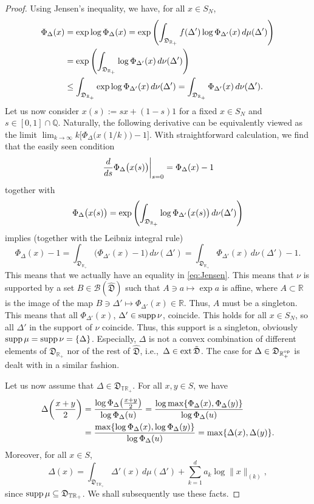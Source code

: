 \documentclass[12pt,a4paper,reqno]{amsart}
\theoremstyle{definition}
\newcommand{\mc}[1]{\mathcal{#1}}
\newcommand{\mf}[1]{\mathfrak{#1}}
\newcommand{\R}{\mathbb R}
\newcommand{\Q}{\mathbb Q}
\newcommand{\T}{\mathbb T}
\let\originalleft\left
\let\originalright\right
\renewcommand{\left}{\mathopen{}\mathclose\bgroup\originalleft}
\renewcommand{\right}{\aftergroup\egroup\originalright}
\begin{document}
\begin{proof}
Using Jensen's inequality, we have, for all $x\in S_N$,
\begin{align}
\Phi_\Delta(x)&=\exp{\log{\Phi_\Delta(x)}}=\exp{\left(\int_{\mf D_{\R_+}}f(\Delta')\log{\Phi_{\Delta'}(x)}\,d\mu(\Delta')\right)}\nonumber\\
&=\exp{\left(\int_{\mf D_{\R_+}}\log{\Phi_{\Delta'}(x)}\,d\nu(\Delta')\right)}\nonumber\\
&\leq\int_{\mf D_{\R_+}}\exp{\log{\Phi_{\Delta'}(x)}}\,d\nu(\Delta')=\int_{\mf D_{\R_+}}\Phi_{\Delta'}(x)\,d\nu(\Delta').\label{eq:Jensen}
\end{align}
Let us now consider $x(s):=sx+(1-s)1$ for a fixed $x\in S_N$ and $s\in[0,1]\cap\Q$. Naturally, the following derivative can be equivalently viewed as the limit $\lim_{k\to\infty} k\big[\Phi_\Delta\big(x(1/k)\big)-1\big]$. With straightforward calculation, we find that the easily seen condition
$$
\left.\frac{d}{ds}\Phi_\Delta\big(x(s)\big)\right|_{s=0}=\Phi_\Delta(x)-1
$$
together with
$$
\Phi_\Delta\big(x(s)\big)=\exp{\left(\int_{\mf D_{\R_+}}\log{\Phi_{\Delta'}\big(x(s)\big)}\,d\nu(\Delta')\right)}
$$
implies (together with the Leibniz integral rule)
$$
\Phi_\Delta(x)-1=\int_{\mf D_{\R_+}}\big(\Phi_{\Delta'}(x)-1\big)\,d\nu(\Delta')=\int_{\mf D_{\R_+}}\Phi_{\Delta'}(x)\,d\nu(\Delta')-1.
$$
This means that we actually have an equality in \eqref{eq:Jensen}. This means that $\nu$ is supported by a set $B\in\mc B(\hat{\mf D})$ such that $A\ni a\mapsto\exp{a}$ is affine, where $A\subset\R$ is the image of the map $B\ni\Delta'\mapsto\Phi_{\Delta'}(x)\in\R$. Thus, $A$ must be a singleton. This means that all $\Phi_{\Delta'}(x)$, $\Delta'\in{\rm supp}\,\nu$, coincide. This holds for all $x\in S_N$, so all $\Delta'$ in the support of $\nu$ coincide. Thus, this support is a singleton, obviously ${\rm supp}\,\mu={\rm supp}\,\nu=\{\Delta\}$. Especially, $\Delta$ is not a convex combination of different elements of $\mf D_{\R_+}$ nor of the rest of $\hat{\mf D}$, i.e.,\ $\Delta\in{\rm ext}\,\tilde{\mf D}$. The case for $\Delta\in\mf D_{\R_+^{\rm op}}$ is dealt with in a similar fashion.

Let us now assume that $\Delta\in\mf D_{\T\R_+}$. For all $x,y\in S$, we have
\begin{align*}
\Delta\left(\frac{x+y}{2}\right)&=\frac{\log{\Phi_\Delta\left(\frac{x+y}{2}\right)}}{\log{\Phi_\Delta(u)}}=\frac{\log{\max\{\Phi_\Delta(x),\Phi_\Delta(y)\}}}{\log{\Phi_\Delta(u)}}\nonumber\\
&=\frac{\max\{\log{\Phi_\Delta(x)},\log{\Phi_\Delta(y)}\}}{\log{\Phi_\Delta(u)}}=\max\{\Delta(x),\Delta(y)\}.
\end{align*}
Moreover, for all $x\in S$,
$$
\Delta(x)=\int_{\mf D_{\T\R_+}}\Delta'(x)\,d\mu(\Delta')+\sum_{k=1}^d a_k\log{\|x\|_{(k)}},
$$
since ${\rm supp}\,\mu\subseteq\mf D_{\T\R_+}$. We shall subsequently use these facts.


\end{proof}
\end{document}
